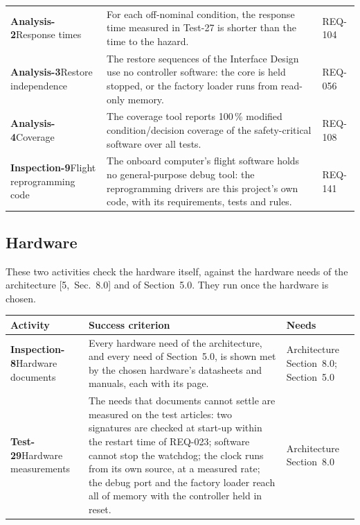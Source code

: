 \documentclass[11pt,a4paper]{article}
\begin{document}
{\begin{xltabular}{\textwidth}{@{}>{\raggedright\arraybackslash}p{3.0cm}>{\raggedright\arraybackslash}X>{\raggedright\arraybackslash}p{2.4cm}@{}}
\textbf{Analysis-2}\newline Response times & For each off-nominal condition, the response time measured in Test-27 is shorter than the time to the hazard. & REQ-104 \\
\textbf{Analysis-3}\newline Restore independence & The restore sequences of the Interface Design use no controller software: the core is held stopped, or the factory loader runs from read-only memory. & REQ-056 \\
\textbf{Analysis-4}\newline Coverage & The coverage tool reports 100\,\% modified condition/decision coverage of the safety-critical software over all tests. & REQ-108 \\
\textbf{Inspection-9}\newline Flight reprogramming code & The onboard computer's flight software holds no general-purpose debug tool: the reprogramming drivers are this project's own code, with its requirements, tests and rules. & REQ-141 \\
\bottomrule
\end{xltabular}}
\addtocounter{table}{-1}

\subsection{Hardware}
These two activities check the hardware itself, against the hardware needs of
the architecture [5,~Sec.~8.0] and of Section~5.0. They run once the hardware
is chosen.
{\footnotesize
\begin{xltabular}{\textwidth}{@{}>{\raggedright\arraybackslash}p{3.0cm}>{\raggedright\arraybackslash}X>{\raggedright\arraybackslash}p{2.4cm}@{}}
\toprule
Activity & Success criterion & Needs \\
\midrule
\endhead
\textbf{Inspection-8}\newline Hardware documents & Every hardware need of the architecture, and every need of Section~5.0, is shown met by the chosen hardware's datasheets and manuals, each with its page. & Architecture Section~8.0; Section~5.0 \\
\textbf{Test-29}\newline Hardware measurements & The needs that documents cannot settle are measured on the test articles: two signatures are checked at start-up within the restart time of REQ-023; software cannot stop the watchdog; the clock runs from its own source, at a measured rate; the debug port and the factory loader reach all of memory with the controller held in reset. & Architecture Section~8.0 \\
\bottomrule
\end{xltabular}}
\addtocounter{table}{-1}
\end{document}
